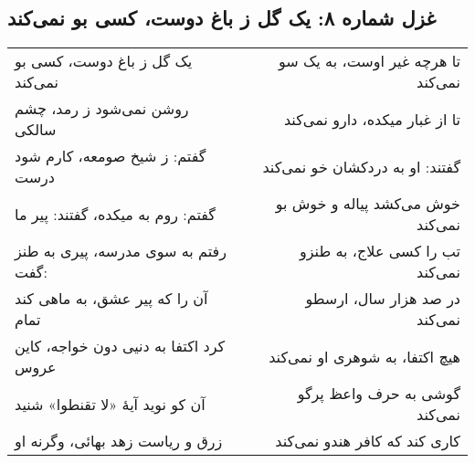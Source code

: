 \begin{center}
\section*{غزل شماره ۸: یک گل ز باغ دوست، کسی بو نمی‌کند}
\label{sec:008}
\begin{longtable}{l p{0.5cm} r}
یک گل ز باغ دوست، کسی بو نمی‌کند
&&
تا هرچه غیر اوست، به یک سو نمی‌کند
\\
روشن نمی‌شود ز رمد، چشم سالکی
&&
تا از غبار میکده، دارو نمی‌کند
\\
گفتم: ز شیخ صومعه، کارم شود درست
&&
گفتند: او به دردکشان خو نمی‌کند
\\
گفتم: روم به میکده، گفتند: پیر ما
&&
خوش می‌کشد پیاله و خوش بو نمی‌کند
\\
رفتم به سوی مدرسه، پیری به طنز گفت:
&&
تب را کسی علاج، به طنزو نمی‌کند
\\
آن را که پیر عشق، به ماهی کند تمام
&&
در صد هزار سال، ارسطو نمی‌کند
\\
کرد اکتفا به دنیی دون خواجه، کاین عروس
&&
هیچ اکتفا، به شوهری او نمی‌کند
\\
آن کو نوید آیهٔ «لا تقنطوا» شنید
&&
گوشی به حرف واعظ پرگو نمی‌کند
\\
زرق و ریاست زهد بهائی، وگرنه او
&&
کاری کند که کافر هندو نمی‌کند
\\
\end{longtable}
\end{center}
